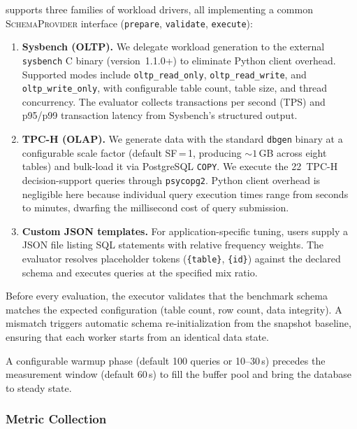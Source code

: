 \sysname supports three families of workload drivers, all implementing a
common \textsc{SchemaProvider} interface (\texttt{prepare},
\texttt{validate}, \texttt{execute}):

\begin{enumerate}
  \item \textbf{Sysbench (OLTP).}  We delegate workload generation to the
    external \texttt{sysbench} C binary (version~1.1.0+) to eliminate Python
    client overhead.  Supported modes include \texttt{oltp\_read\_only},
    \texttt{oltp\_read\_write}, and \texttt{oltp\_write\_only}, with
    configurable table count, table size, and thread concurrency.  The
    evaluator collects transactions per second (TPS) and p95/p99 transaction
    latency from Sysbench's structured output.
  \item \textbf{TPC-H (OLAP).}  We generate data with the standard
    \texttt{dbgen} binary at a configurable scale factor (default SF\,=\,1,
    producing ${\sim}1$\,GB across eight tables) and bulk-load it via
    PostgreSQL \texttt{COPY}.  We execute the 22~TPC-H decision-support
    queries through \texttt{psycopg2}.  Python client overhead is negligible
    here because individual query execution times range from seconds to
    minutes, dwarfing the millisecond cost of query submission.
  \item \textbf{Custom JSON templates.}  For application-specific tuning,
    users supply a JSON file listing SQL statements with relative frequency
    weights.  The evaluator resolves placeholder tokens
    (\texttt{\{table\}}, \texttt{\{id\}}) against the declared schema and
    executes queries at the specified mix ratio.
\end{enumerate}

Before every evaluation, the executor validates that the benchmark schema
matches the expected configuration (table count, row count, data integrity).
A mismatch triggers automatic schema re-initialization from the snapshot
baseline, ensuring that each worker starts from an identical data state.

A configurable warmup phase (default 100 queries or 10--30\,s) precedes the
measurement window (default 60\,s) to fill the buffer pool and bring the
database to steady state.

\subsubsection{Metric Collection}
\label{sssec:metrics}

